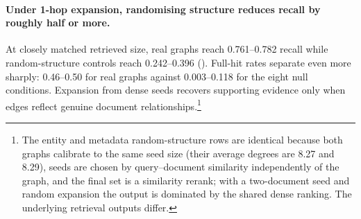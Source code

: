 \documentclass[11pt]{article}
\begin{document}
\begin{table}[t]
  \centering
  \small
  \caption{Real graphs versus random controls, $k{=}17$. Under No-PCST the random-structure controls are closely size-matched for entity, metadata and combined (12.7--13.0 vs 12.9); semantic and shuffled-node controls run 2--3 documents smaller, which if anything favours them. Under PCST the controls are \textit{not} size-matched, retrieving roughly twice as many documents.}
  \label{tab:random}
\end{table}

\paragraph{Under 1-hop expansion, randomising structure reduces recall by roughly half or more.} At closely matched retrieved size, real graphs reach 0.761--0.782 recall while random-structure controls reach 0.242--0.396 (). Full-hit rates separate even more sharply: 0.46--0.50 for real graphs against 0.003--0.118 for the eight null conditions. Expansion from dense seeds recovers supporting evidence only when edges reflect genuine document relationships.\footnote{The entity and metadata random-structure rows are identical because both graphs calibrate to the same seed size (their average degrees are 8.27 and 8.29), seeds are chosen by query--document similarity independently of the graph, and the final set is a similarity rerank; with a two-document seed and random expansion the output is dominated by the shared dense ranking. The underlying retrieval outputs differ.}
\end{document}
